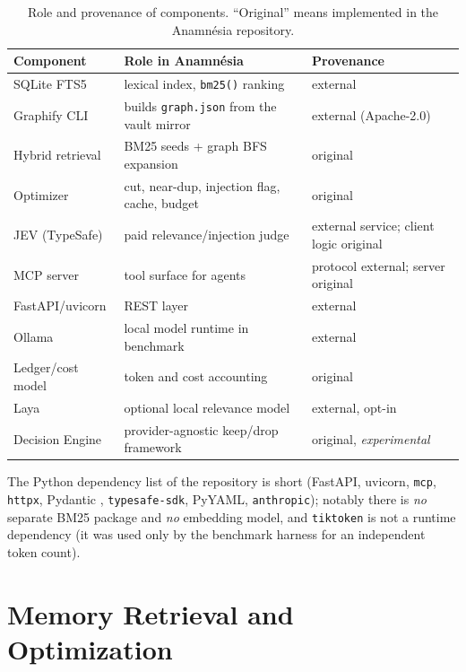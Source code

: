 \documentclass[conference,onecolumn,11pt]{IEEEtran}
\newcommand{\anam}{Anam\-n\'esia}
\begin{document}
\begin{table}[t]\caption{Role and provenance of components. ``Original'' means implemented in the \anam{} repository.}\label{tab:credits}\centering\footnotesize\setlength{\tabcolsep}{3pt}
\begin{tabularx}{\columnwidth}{@{}p{}Xp{}@{}}\toprule
Component & Role in \anam{} & Provenance\\\midrule
SQLite FTS5 & lexical index, \texttt{bm25()} ranking \cite{sqlitefts5} & external\\
Graphify CLI & builds \texttt{graph.json} from the vault mirror \cite{graphify} & external (Apache-2.0)\\
Hybrid retrieval & BM25 seeds + graph BFS expansion & original\\
Optimizer & cut, near-dup, injection flag, cache, budget & original\\
JEV (TypeSafe) & paid relevance/injection judge \cite{typesafedocs} & external service; client logic original\\
MCP server & tool surface for agents \cite{mcpspec} & protocol external; server original\\
FastAPI/uvicorn & REST layer \cite{fastapi} & external\\
Ollama & local model runtime in benchmark \cite{ollama} & external\\
Ledger/cost model & token and cost accounting & original\\
Laya & optional local relevance model \cite{laya} & external, opt-in\\
Decision Engine & provider-agnostic keep/drop framework & original, \emph{experimental}\\\bottomrule
\end{tabularx}\end{table}

The Python dependency list of the repository is short (FastAPI, uvicorn, \texttt{mcp}, \texttt{httpx}, Pydantic \cite{pydantic}, \texttt{typesafe-sdk}, PyYAML, \texttt{anthropic}); notably there is \emph{no} separate BM25 package and \emph{no} embedding model, and \texttt{tiktoken} \cite{tiktoken} is not a runtime dependency (it was used only by the benchmark harness for an independent token count).

\section{Memory Retrieval and Optimization}\label{sec:retrieval}
\end{document}
